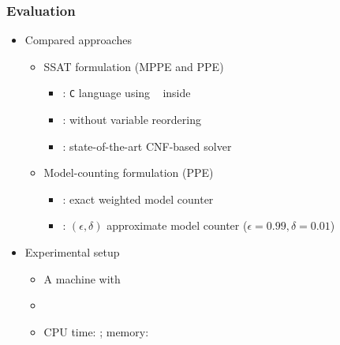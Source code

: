\newcommand{\ncircuit}{\num{30}}

\begin{frame}
    \frametitle{Evaluation}
    \begin{itemize}
        \item Compared approaches
              \pause
              \begin{itemize}
                  \item SSAT formulation (MPPE and PPE)
                        \pause
                        \begin{itemize}
                            \item \bddsp: \texttt{C} language using \cudd~\cite{CUDD} inside \abc~\cite{ABC}
                                  \pause
                            \item \bddspnr: \bddsp without variable reordering
                                  \pause
                            \item \dcssat: state-of-the-art CNF-based solver
                                  \pause
                        \end{itemize}
                  \item Model-counting formulation (PPE)
                        \pause
                        \begin{itemize}
                            \item \cachet: exact weighted model counter
                                  \pause
                            \item \approxmc: $(\epsilon,\delta)$ approximate model counter ($\epsilon=0.99,\delta=0.01$)
                                  \pause
                        \end{itemize}
              \end{itemize}
        \item Experimental setup
              \pause
              \begin{itemize}
                  \item A machine with~\machineSpec
                        \pause
                  \item \osInfo
                        \pause
                  \item CPU time: \timelimit; memory: \memlimit
              \end{itemize}
    \end{itemize}
\end{frame}

